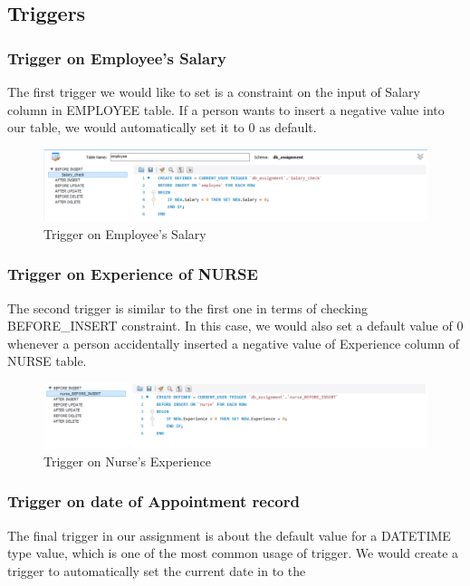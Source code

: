 \subsection{Triggers}

\subsubsection{Trigger on Employee's Salary}
The first trigger we would like to set is a constraint on the input of Salary column in EMPLOYEE table. If a person wants to insert a negative value into our table, we would automatically set it to 0 as default.

\begin{figure}[H]
  \centering
  \includegraphics[width = 12cm]{assets/trigger_1.png}
  \captionsetup{justification=centering,margin=2cm}
  \caption{Trigger on Employee's Salary}
\end{figure}

\subsubsection{Trigger on Experience of NURSE}
The second trigger is similar to the first one in terms of checking BEFORE\_INSERT constraint. In this case, we would also set a default value of 0 whenever a person accidentally inserted a negative value of Experience column of NURSE table.

\begin{figure}[H]
  \centering
  \includegraphics[width = 12cm]{assets/trigger_2.png}
  \captionsetup{justification=centering,margin=2cm}
  \caption{Trigger on Nurse's Experience}
\end{figure}

\subsubsection{Trigger on date of Appointment record}

The final trigger in our assignment is about the default value for a DATETIME type value, which is one of the most common usage of trigger. We would create a trigger to automatically set the current date in to the

